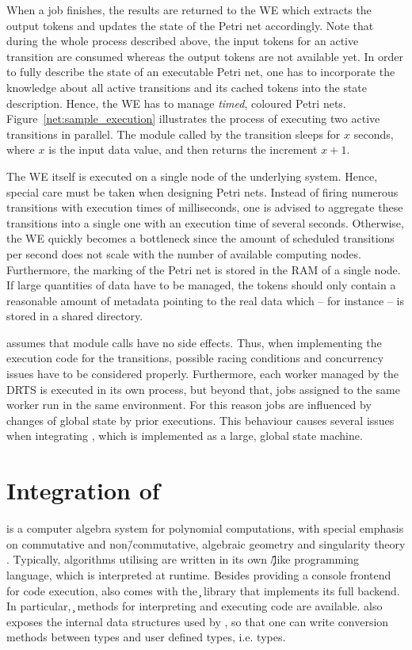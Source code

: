 When a job finishes, the results are returned to the \ac{WE} which extracts the output tokens and updates the state of the Petri net accordingly. Note that during the whole process described above, the input tokens for an active transition are consumed whereas the output tokens are not available yet. In order to fully describe the state of an executable Petri net, one has to incorporate the knowledge about all active transitions and its cached tokens into the state description. Hence, the \ac{WE} has to manage \emph{timed}, coloured Petri nets. Figure~\ref{net:sample_execution} illustrates the process of executing two active transitions in parallel. The module called by the transition sleeps for $x$ seconds, where $x$ is the input data value, and then returns the increment $x + 1$.



The \ac{WE} itself is executed on a single node of the underlying system. Hence, special care must be taken when designing Petri nets. Instead of firing numerous transitions with execution times of milliseconds, one is advised to aggregate these transitions into a single one with an execution time of several seconds. Otherwise, the \ac{WE} quickly becomes a bottleneck since the amount of scheduled transitions per second does not scale with the number of available computing nodes. Furthermore, the marking of the Petri net is stored in the RAM of a single node. If large quantities of data have to be managed, the tokens should only contain a reasonable amount of metadata pointing to the real data which -- for instance -- is stored in a shared directory.

\gpispace{} assumes that module calls have no side effects. Thus, when implementing the execution code for the transitions, possible racing conditions and concurrency issues have to be considered properly. Furthermore, each worker managed by the \ac{DRTS} is executed in its own process, but beyond that, jobs assigned to the same worker run in the same environment. For this reason jobs are influenced by changes of global state by prior executions. This behaviour causes several issues when integrating \singular{}, which is implemented as a large, global state machine.

\section{Integration of \singular}
\singular{} is a computer algebra system for polynomial computations, with special emphasis on commutative and non\=/commutative, algebraic geometry and singularity theory \cite{singular}. Typically, algorithms utilising \singular{} are written in its own \c\=/like programming language, which is interpreted at runtime. Besides providing a console frontend for code execution, \singular{} also comes with the \c{} library \libsingular{} that implements its full backend. In particular, \c{} methods for interpreting and executing \singular{} code are available. \libsingular{} also exposes the internal data structures used by \singular{}, so that one can write conversion methods between \singular{} types and user defined types, i.e. \gpispace{} types.

